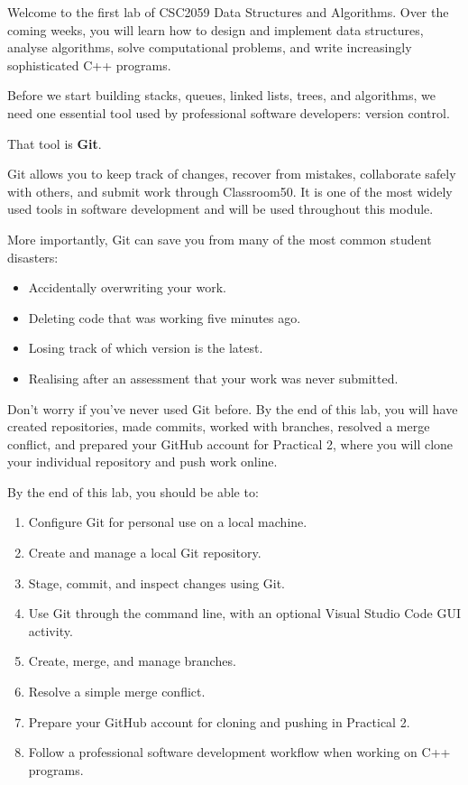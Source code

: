 \documentclass{csc2059practical}
\begin{document}
\maketitle
\tableofcontents
\clearpage
{}
Welcome to the first lab of CSC2059 Data Structures and Algorithms. Over the coming weeks, you will learn how to design and implement data structures, analyse algorithms, solve computational problems, and write increasingly sophisticated C++ programs.

Before we start building stacks, queues, linked lists, trees, and algorithms, we need one essential tool used by professional software developers: version control.

That tool is \textbf{Git}.

Git allows you to keep track of changes, recover from mistakes, collaborate safely with others, and submit work through Classroom50. It is one of the most widely used tools in software development and will be used throughout this module.

More importantly, Git can save you from many of the most common student disasters:

\begin{itemize}
  \item Accidentally overwriting your work.
  \item Deleting code that was working five minutes ago.
  \item Losing track of which version is the latest.
  \item Realising after an assessment that your work was never submitted.
\end{itemize}
Don't worry if you've never used Git before. By the end of this lab, you will have created repositories, made commits, worked with branches, resolved a merge conflict, and prepared your GitHub account for Practical 2, where you will clone your individual repository and push work online.

\begin{learningoutcomes}
By the end of this lab, you should be able to:

\begin{enumerate}
  \item Configure Git for personal use on a local machine.
  \item Create and manage a local Git repository.
  \item Stage, commit, and inspect changes using Git.
  \item Use Git through the command line, with an optional Visual Studio Code GUI activity.
  \item Create, merge, and manage branches.
  \item Resolve a simple merge conflict.
  \item Prepare your GitHub account for cloning and pushing in Practical 2.
  \item Follow a professional software development workflow when working on C++ programs.
\end{enumerate}
\end{learningoutcomes}
\end{document}
